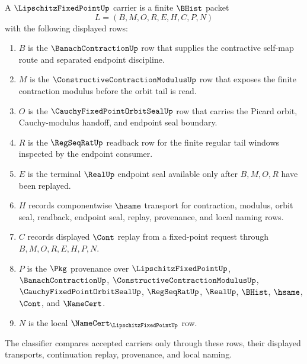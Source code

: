 \begin{definition}
\label{def:lipschitz-fixed-point-carrier}
A $\LipschitzFixedPointUp$ carrier is a finite $\BHist$ packet
$$
L=(B,M,O,R,E,H,C,P,N)
$$
with the following displayed rows:
\begin{enumerate}
\item $B$ is the $\BanachContractionUp$ row that supplies the contractive self-map route and separated endpoint discipline.
\item $M$ is the $\ConstructiveContractionModulusUp$ row that exposes the finite contraction modulus before the orbit tail is read.
\item $O$ is the $\CauchyFixedPointOrbitSealUp$ row that carries the Picard orbit, Cauchy-modulus handoff, and endpoint seal boundary.
\item $R$ is the $\RegSeqRatUp$ readback row for the finite regular tail windows inspected by the endpoint consumer.
\item $E$ is the terminal $\RealUp$ endpoint seal available only after $B,M,O,R$ have been replayed.
\item $H$ records componentwise $\hsame$ transport for contraction, modulus, orbit seal, readback, endpoint seal, replay, provenance, and local naming rows.
\item $C$ records displayed $\Cont$ replay from a fixed-point request through $B,M,O,R,E,H,P,N$.
\item $P$ is the $\Pkg$ provenance over $\LipschitzFixedPointUp$, $\BanachContractionUp$, $\ConstructiveContractionModulusUp$, $\CauchyFixedPointOrbitSealUp$, $\RegSeqRatUp$, $\RealUp$, $\BHist$, $\hsame$, $\Cont$, and $\NameCert$.
\item $N$ is the local $\NameCert_{\LipschitzFixedPointUp}$ row.
\end{enumerate}
The classifier compares accepted carriers only through these rows, their displayed transports, continuation replay, provenance, and local naming.
\end{definition}

